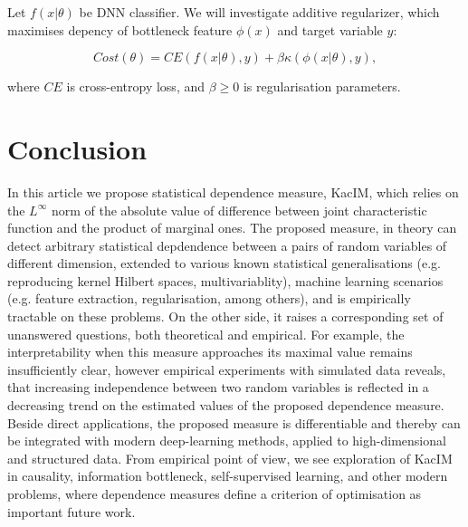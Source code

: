 \documentclass{article}
\begin{document}
Let $f(x|\theta)$ be DNN classifier. We will investigate additive regularizer, which maximises depency of bottleneck feature $\phi(x)$ and target variable $y$: 

\begin{equation}
Cost(\theta) = CE(f(x|\theta),y) + \beta \kappa(\phi(x|\theta),y),
\end{equation}

\noindent where $CE$ is cross-entropy loss, and $\beta \geq 0$ is regularisation parameters.


\section{Conclusion} 

\label{section:conclusion}
In this article we propose statistical dependence measure, KacIM, which relies on the $L^{\infty}$ norm of the absolute value of difference between joint characteristic function and the product of marginal ones. The proposed measure, in theory can detect arbitrary statistical depdendence between a pairs of random variables of different dimension, extended to various known statistical generalisations (e.g. reproducing kernel Hilbert spaces, multivariablity), machine learning scenarios (e.g. feature extraction, regularisation, among others), and is empirically tractable on these problems. On the other side, it raises a corresponding set of unanswered questions, both theoretical and empirical. For example, the interpretability when this measure approaches its maximal value remains insufficiently clear, however empirical experiments with simulated data reveals, that increasing independence between two random variables is reflected in a decreasing trend on the estimated values of the proposed dependence measure. Beside direct applications, the proposed measure is differentiable and thereby can be integrated with modern deep-learning methods, applied to high-dimensional and structured data. From empirical point of view, we see exploration of KacIM in causality, information bottleneck, self-supervised learning, and other modern problems, where dependence measures define a criterion of optimisation as important future work.
\end{document}
